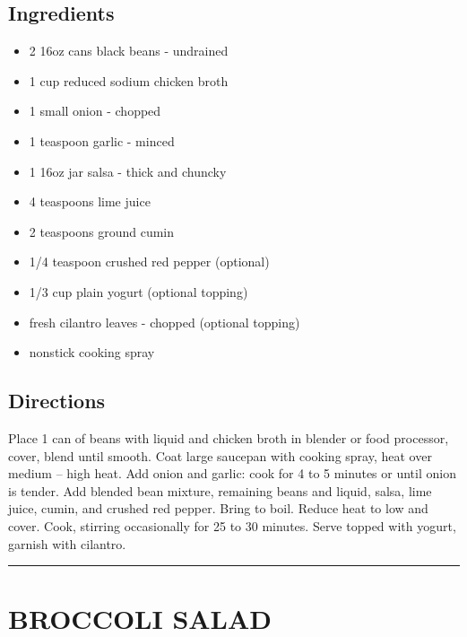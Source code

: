 \documentclass[
]{book}
\providecommand{\tightlist}{%
  \setlength{\itemsep}{0pt}\setlength{\parskip}{0pt}}
\begin{document}
\hypertarget{ingredients-13}{%
\subsection*{Ingredients}\label{ingredients-13}}


\begin{itemize}
\tightlist
\item
  2 16oz cans black beans - undrained
\item
  1 cup reduced sodium chicken broth
\item
  1 small onion - chopped
\item
  1 teaspoon garlic - minced
\item
  1 16oz jar salsa - thick and chuncky
\item
  4 teaspoons lime juice
\item
  2 teaspoons ground cumin
\item
  1/4 teaspoon crushed red pepper (optional)
\item
  1/3 cup plain yogurt (optional topping)
\item
  fresh cilantro leaves - chopped (optional topping)
\item
  nonstick cooking spray
\end{itemize}

\hypertarget{directions-13}{%
\subsection*{Directions}\label{directions-13}}


Place 1 can of beans with liquid and chicken broth in blender or food processor, cover, blend until smooth. Coat large saucepan with cooking spray, heat over medium -- high heat. Add onion and garlic: cook for 4 to 5 minutes or until onion is tender. Add blended bean mixture, remaining beans and liquid, salsa, lime juice, cumin, and crushed red pepper. Bring to boil. Reduce heat to low and cover. Cook, stirring occasionally for 25 to 30 minutes. Serve topped with yogurt, garnish with cilantro.

\begin{center}\rule{0.5\linewidth}{0.5pt}\end{center}

\hypertarget{broccoli-salad}{%
\section*{BROCCOLI SALAD}\label{broccoli-salad}}
\end{document}
